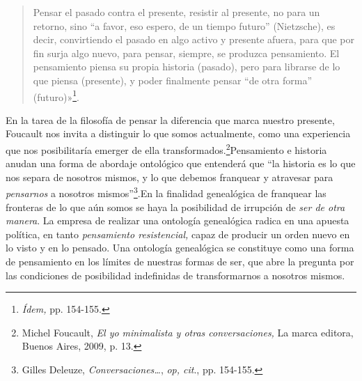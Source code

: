 \begin{quote}
Pensar el pasado contra el presente, resistir al presente, no para un retorno, sino \enquote{a favor, eso espero, de un tiempo futuro} (Nietzsche), es decir, convirtiendo el pasado en algo activo y presente afuera, para que por fin surja algo nuevo, para pensar, siempre, se produzca pensamiento. El pensamiento piensa su propia historia (pasado), pero para librarse de lo que piensa (presente), y poder finalmente pensar \enquote{de otra forma} (futuro)»\footnote{\emph{Ídem,} pp. 154-155.}.
\end{quote}

En la tarea de la filosofía de pensar la diferencia que marca nuestro presente, Foucault nos invita a distinguir lo que somos actualmente, como una experiencia que nos posibilitaría emerger de ella transformados.\footnote{Michel Foucault, \emph{El yo minimalista y otras conversaciones,} La marca editora, Buenos Aires, 2009, p. 13.}Pensamiento e historia anudan una forma de abordaje ontológico que entenderá que \enquote{la historia es lo que nos separa de nosotros mismos, y lo que debemos franquear y atravesar para \emph{pensarnos} a nosotros mismos}\footnote{Gilles Deleuze, \emph{Conversaciones\ldots{}}, \emph{op, cit}., pp. 154-155.}.En la finalidad genealógica de franquear las fronteras de lo que aún somos se haya la posibilidad de irrupción de \emph{ser de otra manera}. La empresa de realizar una ontología genealógica radica en una apuesta política, en tanto \emph{pensamiento resistencial,} capaz de producir un orden nuevo en lo visto y en lo pensado. Una ontología genealógica se constituye como una forma de pensamiento en los límites de nuestras formas de ser, que abre la pregunta por las condiciones de posibilidad indefinidas de transformarnos a nosotros mismos.

